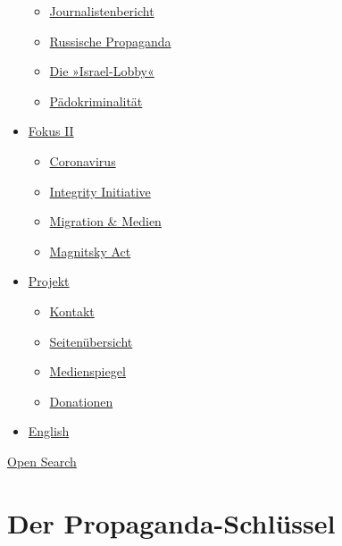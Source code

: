 \begin{itemize}
  \begin{itemize}
  \tightlist
  \item
    \href{https://swprs.org/bericht-eines-journalisten/}{Journalistenbericht}
  \item
    \href{https://swprs.org/russische-propaganda/}{Russische Propaganda}
  \item
    \href{https://swprs.org/die-israel-lobby-fakten-und-mythen/}{Die
    »Israel-Lobby«}
  \item
    \href{https://swprs.org/geopolitik-und-paedokriminalitaet/}{Pädokriminalität}
  \end{itemize}
\item
  \href{https://swprs.org/migration-und-medien/}{Fokus II}

  \begin{itemize}
  \tightlist
  \item
    \href{https://swprs.org/covid-19-hinweis-ii/}{Coronavirus}
  \item
    \href{https://swprs.org/die-integrity-initiative/}{Integrity
    Initiative}
  \item
    \href{https://swprs.org/migration-und-medien/}{Migration \& Medien}
  \item
    \href{https://swprs.org/der-fall-magnitsky/}{Magnitsky Act}
  \end{itemize}
\item
  \href{https://swprs.org/kontakt/}{Projekt}

  \begin{itemize}
  \tightlist
  \item
    \href{https://swprs.org/kontakt/}{Kontakt}
  \item
    \href{https://swprs.org/uebersicht/}{Seitenübersicht}
  \item
    \href{https://swprs.org/medienspiegel/}{Medienspiegel}
  \item
    \href{https://swprs.org/donationen/}{Donationen}
  \end{itemize}
\item
  \href{https://swprs.org/contact/}{English}
\end{itemize}

\protect\hyperlink{}{Open Search}

\hypertarget{der-propaganda-schluxfcssel}{%
\section{Der Propaganda-Schlüssel}\label{der-propaganda-schluxfcssel}}

